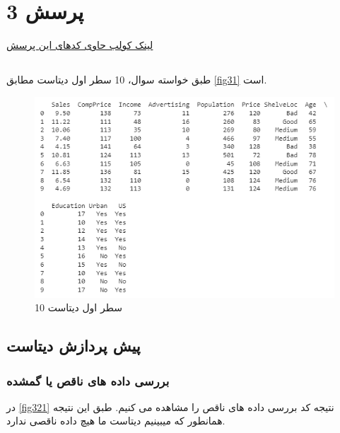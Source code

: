 \documentclass{article}
\begin{document}
\section{پرسش 3}
\href{https://colab.research.google.com/drive/1PsIjMKnh6SxLKSShV9cIGt0ZO9u8hPxs}{لینک کولب حاوی کدهای این پرسش}


\subsection{}

طبق خواسته سوال، 10 سطر اول دیتاست مطابق \autoref{fig31} است.

\begin{figure}[h!]
    \centering
    \includegraphics[width=0.9\linewidth]{q4_p1.png}
    \caption{10 سطر اول دیتاست}
    \label{fig31}
\end{figure}


\subsection{پیش پردازش دیتاست}

\subsubsection{بررسی داده های ناقص یا گمشده}

در \autoref{fig321} نتیجه کد بررسی داده های ناقص را مشاهده می کنیم. طبق این نتیجه همانطور که میبینیم دیتاست ما هیچ داده ناقصی ندارد.
\end{document}

